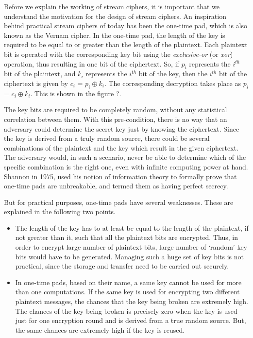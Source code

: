 Before we explain the working of stream ciphers, it is important that we understand the motivation for the design of stream ciphers. An inspiration behind practical stream ciphers of today has been the one-time pad, which is also known as the Vernam cipher. In the one-time pad, the length of the key is required to be equal to or greater than the length of the plaintext. Each plaintext bit is operated with the corresponding key bit using the \emph{exclusive-or} (or \emph{xor}) operation, thus resulting in one bit of the ciphertext. So, if $p_i$ represents the $i^{th}$ bit of the plaintext, and $k_i$ represents the $i^{th}$ bit of the key, then the $i^{th}$ bit of the ciphertext is given by $c_i$ = $p_i \oplus k_i$. The corresponding decryption takes place as $p_i$ = $c_i \oplus k_i$. This is shown in the figure ?.

The key bits are required to be completely random, without any statistical correlation between them. With this pre-condition, there is no way that an adversary could determine the secret key just by knowing the ciphertext. Since the key is derived from a truly random source, there could be several combinations of the plaintext and the key which result in the given ciphertext. The adversary would, in such a scenario, never be able to determine which of the specific combination is the right one, even with infinite computing power at hand.
Shannon in 1975, used his notion of information theory to formally prove that one-time pads are unbreakable, and termed them as having perfect secrecy.

But for practical purposes, one-time pads have several weaknesses. These are explained in the following two points.
\begin{itemize}
\item The length of the key has to at least be equal to the length of the plaintext, if not greater than it, such that all the plaintext bits are encrypted. Thus, in order to encrypt large number of plaintext bits, large number of `random' key bits would have to be generated. Managing such a huge set of key bits is not practical, since the storage and transfer need to be carried out securely. 

\item In one-time pads, based on their name, a same key cannot be used for more than one computations. If the same key is used for encrypting two different plaintext messages, the chances that the key being broken are extremely high. The chances of the key being broken is precisely zero when the key is used just for one encryption round and is derived from a true random source. But, the same chances are extremely high if the key is reused. 
\end{itemize}


